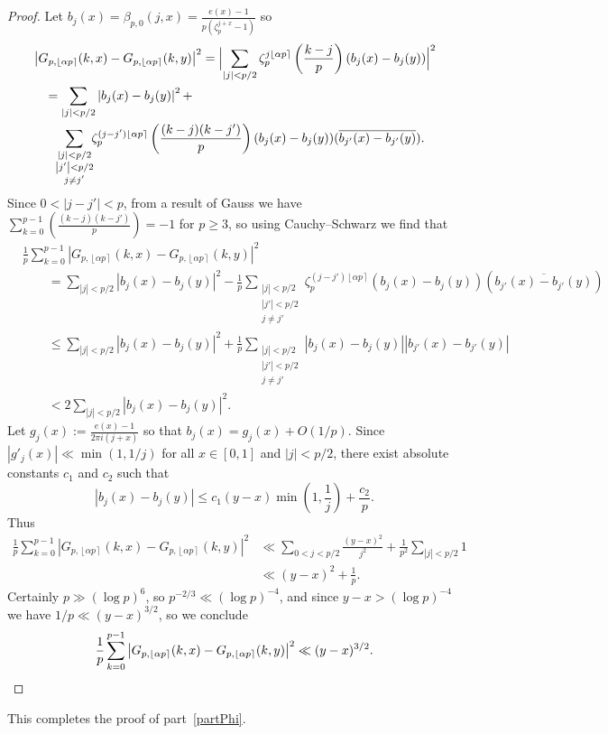 \documentclass[reqno]{amsart}
\numberwithin{equation}{section}
\numberwithin{table}{section}
\numberwithin{figure}{section}
\newcommand{\leg}[2]{\left(\frac{#1}{#2}\right)}
\newcommand{\abs}[1]{\left\lvert#1\right\rvert}
\newcommand{\round}[1]{\left\lfloor#1\right\rceil}
\begin{document}
\begin{proof}
Let $b_j(x) =\beta_{p,0}(j,x) = \frac{e(x)-1}{p(\zeta_p^{j+x}-1)}$ so
\begin{align*}
&\abs{G_{p,\round{\alpha p}}(k,x) - G_{p,\round{\alpha p}}(k,y)}^2 =
\Bigl|\sum_{\abs{j}<p/2} \zeta_p^{j\round{\alpha p}}\leg{k-j}{p} \left( b_j(x) - b_j(y)\right)\Bigr|^2\\
&\quad=
\sum_{\abs{j}<p/2} \abs{b_j(x) - b_j(y)}^2 +\\
&\qquad
\!\!\sum_{\substack{\abs{j}<p/2\\\abs{j'}<p/2\\j\neq j'}}  \!\! \zeta_p^{(j-j')\round{\alpha p}}\leg{(k-j)(k-j')}{p} (b_j(x) - b_j(y))(\overline{b_{j'}(x) - b_{j'}(y)}).
\end{align*}
Since $0<\abs{j-j'}<p$, from a result of Gauss we have $\sum_{k=0}^{p-1} \leg{(k-j)(k-j')}{p}=-1$ for $p\geq3$, so using Cauchy--Schwarz we find that
\begin{align*}
&\frac{1}{p} \sum_{k=0}^{p-1} \abs{G_{p,\round{\alpha p}}(k,x) - G_{p,\round{\alpha p}}(k,y)}^2\\
&\qquad =
\sum_{\abs{j}<p/2} \abs{b_j(x) - b_j(y)}^2
- \frac{1}{p} 
\sum_{\substack{\abs{j}<p/2\\\abs{j'}<p/2\\j\neq j'}} \zeta_p^{(j-j')\round{\alpha p}} (b_j(x) - b_j(y))(\overline{b_{j'}(x) - b_{j'}(y)})\\
&\qquad \leq
\sum_{\abs{j}<p/2} \abs{b_j(x) - b_j(y)}^2
+ \frac{1}{p} 
\sum_{\substack{\abs{j}<p/2\\\abs{j'}<p/2\\j\neq j'}}  \abs{b_j(x) - b_j(y)}\abs{b_{j'}(x) - b_{j'}(y)}\\
&\qquad < 2\sum_{\abs{j}<p/2} \abs{b_j(x) - b_j(y)}^2.
\end{align*}
Let $g_j(x) := \frac{e(x)-1}{2\pi i(j+x)}$ so that $b_j(x) = g_j(x) + O(1/p)$.
Since $\abs{g'_j(x)} \ll \min(1,1/j)$ for all $x\in[0,1]$ and $\abs{j}<p/2$, there exist absolute constants $c_1$ and $c_2$ such that
\[
\abs{b_j(x) - b_j(y)} \leq c_1 (y-x) \min\left(1,\frac{1}{j}\right) + \frac{c_2}{p}.
\]
Thus
\begin{align*}
\frac{1}{p} \sum_{k=0}^{p-1} \abs{G_{p,\round{\alpha p}}(k,x) - G_{p,\round{\alpha p}}(k,y)}^2
&\ll
\sum_{0<j<p/2} \frac{(y-x)^2}{j^2} + \frac{1}{p^2} \sum_{\abs{j}<p/2} 1\\
&\ll
(y-x)^2 + \frac{1}{p}.
\end{align*}
Certainly $p\gg(\log p)^6$, so $p^{-2/3} \ll (\log p)^{-4}$, and since $y-x>(\log p)^{-4}$ we have $1/p \ll (y-x)^{3/2}$, so we conclude
\[
\frac{1}{p} \sum_{k=0}^{p-1} \abs{G_{p,\round{\alpha p}}(k,x) - G_{p,\round{\alpha p}}(k,y)}^2 \ll (y-x)^{3/2}.\qedhere
\]
\end{proof}
This completes the proof of part~\ref{partPhi}.
\end{document}
